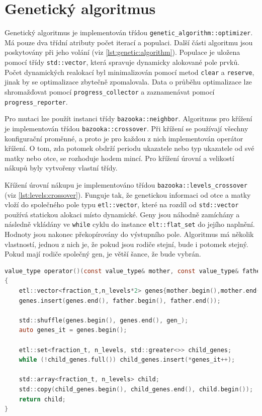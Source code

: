 \section{Genetický algoritmus}
Genetický algoritmus je implementován třídou \texttt{genetic\_algorithm::optimizer}.
Má pouze dva třídní atributy počet iterací a populaci.
Další části algoritmu jsou poskytovány při jeho volání (viz \ref{lst:genetic:algorithm}).
Populace je uložena pomocí třídy \texttt{std::vector}, která spravuje dynamicky alokované pole prvků.
Počet dynamických realokací byl minimalizován pomocí metod \texttt{clear} a \texttt{reserve}, jinak by se optimalizace zbytečně zpomalovala.
Data o průběhu optimalizace lze shromažďovat pomocí \texttt{progress\_collector} a zaznamenávat pomocí \texttt{progress\_reporter}.

Pro mutaci lze použít instanci třídy \texttt{bazooka::neighbor}.
Algoritmus pro křížení je implementován třídou \texttt{bazooka::crossover}.
Při křížení se používají všechny konfigurační proměnné, a proto je pro každou z nich implementován operátor křížení.
O tom, zda potomek obdrží periodu ukazatele nebo typ ukazatele od své matky nebo otce, se rozhoduje hodem mincí.
Pro křížení úrovní a velikostí nákupů byly vytvořeny vlastní třídy.

Křížení úrovní nákupu je implementováno třídou \texttt{bazooka::levels\_crossover} (viz \ref{lst:levels:crossover}).
Funguje tak, že genetickou informaci od otce a matky vloží do společného pole typu \texttt{etl::vector}, které na rozdíl od \texttt{std::vector} používá statickou alokaci místo dynamické.
Geny jsou náhodně zamíchány a následně vkládány ve \texttt{while} cyklu do instance \texttt{elt::flat\_set} do jejího naplnění.
Hodnoty jsou nakonec překopírovány do výstupního pole.
Algoritmus má několik vlastností, jednou z nich je, že pokud jsou rodiče stejní, bude i potomek stejný.
Pokud mají rodiče společný gen, je větší šance, že bude vybrán.

\begin{lstlisting}[caption={~Implementace křížení nákupních úrovní},label={lst:levels:crossover},captionpos=t,abovecaptionskip=-\medskipamount,belowcaptionskip=\medskipamount,language=C]
value_type operator()(const value_type& mother, const value_type& father)
{
    etl::vector<fraction_t,n_levels*2> genes{mother.begin(),mother.end()};
    genes.insert(genes.end(), father.begin(), father.end());

    std::shuffle(genes.begin(), genes.end(), gen_);
    auto genes_it = genes.begin();

    etl::set<fraction_t, n_levels, std::greater<>> child_genes;
    while (!child_genes.full()) child_genes.insert(*genes_it++);

    std::array<fraction_t, n_levels> child;
    std::copy(child_genes.begin(), child_genes.end(), child.begin());
    return child;
}
\end{lstlisting}

